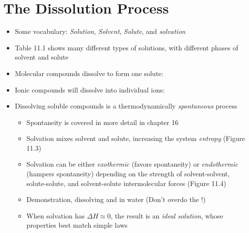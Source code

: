 \documentclass[12pt, openany, letterpaper]{memoir}
\begin{document}
\section{The Dissolution Process}
\begin{itemize}
  \item Some vocabulary: \emph{Solution}, \emph{Solvent}, \emph{Solute}, and \emph{solvation}
  \item Table 11.1 shows many different types of solutions, with different phases of solvent and solute
  \item Molecular compounds dissolve to form one solute:

  \item Ionic compounds will dissolve into individual ions:

  \item Dissolving soluble compounds is a thermodynamically \emph{spontaneous} process
  \begin{itemize}
    \item Spontaneity is covered in more detail in chapter 16
    \item Solvation mixes solvent and solute, increasing the system \emph{entropy} (Figure 11.3)
    \item Solvation can be either \emph{exothermic} (favors spontaneity) or \emph{endothermic} (hampers spontaneity) depending on the strength of solvent-solvent, solute-solute, and solvent-solute intermolecular forces (Figure 11.4)
    \item Demonstration, dissolving  and  in water (Don't overdo the !)
    \item When solvation has $\Delta H \approx 0$, the result is an \emph{ideal solution}, whose properties best match simple laws
  \end{itemize}
\end{itemize}
\end{document}
